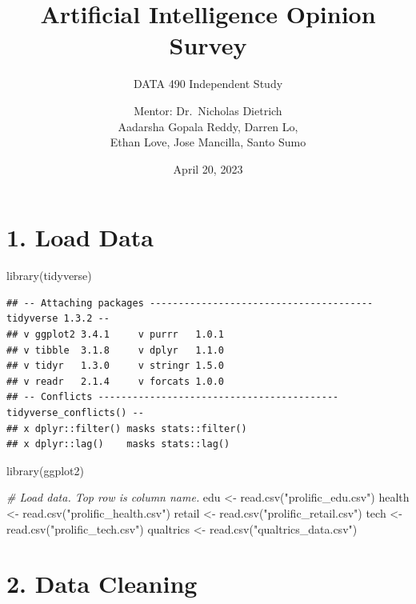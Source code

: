 \documentclass[
]{article}
\title{Artificial Intelligence Opinion Survey}
\subtitle{DATA 490 Independent Study}
\author{Mentor: Dr.~Nicholas Dietrich\\
Aadarsha Gopala Reddy, Darren Lo,\\
Ethan Love, Jose Mancilla, Santo Sumo}
\date{April 20, 2023}
\newenvironment{Shaded}{\begin{snugshade}}{\end{snugshade}}
\newcommand{\CommentTok}[1]{\textcolor[rgb]{0.56,0.35,0.01}{\textit{#1}}}
\newcommand{\FunctionTok}[1]{\textcolor[rgb]{0.00,0.00,0.00}{#1}}
\newcommand{\NormalTok}[1]{#1}
\newcommand{\OtherTok}[1]{\textcolor[rgb]{0.56,0.35,0.01}{#1}}
\newcommand{\StringTok}[1]{\textcolor[rgb]{0.31,0.60,0.02}{#1}}
\begin{document}
\maketitle

{
\setcounter{tocdepth}{2}
\tableofcontents
}
\hypertarget{load-data}{%
\section{1. Load Data}\label{load-data}}

\begin{Shaded}
\begin{Highlighting}[]
\FunctionTok{library}\NormalTok{(tidyverse)}
\end{Highlighting}
\end{Shaded}

\begin{verbatim}
## -- Attaching packages --------------------------------------- tidyverse 1.3.2 --
## v ggplot2 3.4.1     v purrr   1.0.1
## v tibble  3.1.8     v dplyr   1.1.0
## v tidyr   1.3.0     v stringr 1.5.0
## v readr   2.1.4     v forcats 1.0.0
## -- Conflicts ------------------------------------------ tidyverse_conflicts() --
## x dplyr::filter() masks stats::filter()
## x dplyr::lag()    masks stats::lag()
\end{verbatim}

\begin{Shaded}
\begin{Highlighting}[]
\FunctionTok{library}\NormalTok{(ggplot2)}

\CommentTok{\# Load data. Top row is column name.}
\NormalTok{edu }\OtherTok{\textless{}{-}} \FunctionTok{read.csv}\NormalTok{(}\StringTok{"prolific\_edu.csv"}\NormalTok{)}
\NormalTok{health }\OtherTok{\textless{}{-}} \FunctionTok{read.csv}\NormalTok{(}\StringTok{"prolific\_health.csv"}\NormalTok{)}
\NormalTok{retail }\OtherTok{\textless{}{-}} \FunctionTok{read.csv}\NormalTok{(}\StringTok{"prolific\_retail.csv"}\NormalTok{)}
\NormalTok{tech }\OtherTok{\textless{}{-}} \FunctionTok{read.csv}\NormalTok{(}\StringTok{"prolific\_tech.csv"}\NormalTok{)}
\NormalTok{qualtrics }\OtherTok{\textless{}{-}} \FunctionTok{read.csv}\NormalTok{(}\StringTok{"qualtrics\_data.csv"}\NormalTok{)}
\end{Highlighting}
\end{Shaded}

\hypertarget{data-cleaning}{%
\section{2. Data Cleaning}\label{data-cleaning}}
\end{document}
